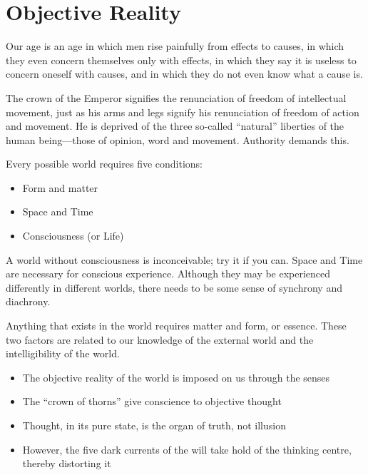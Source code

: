 \section{Objective Reality}

\begin{quotex}
Our age is an age in which men rise painfully from effects to causes, in which they even concern themselves only with effects, in which they say it is useless to concern oneself with causes, and in which they do not even know what a cause is.

The crown of the Emperor signifies the renunciation of freedom of intellectual movement, just as his arms and legs signify his renunciation of freedom of action and movement. He is deprived of the three so-called ``natural'' liberties of the human being---those of opinion, word and movement. Authority demands this.
\end{quotex}


Every possible world requires five conditions:

\begin{itemize}


\item Form and matter

\item Space and Time

\item Consciousness (or Life)
\end{itemize}


A world without consciousness is inconceivable; try it if you can. Space and Time are necessary for conscious experience. Although they may be experienced differently in different worlds, there needs to be some sense of synchrony and diachrony.

Anything that exists in the world requires matter and form, or essence. These two factors are related to our knowledge of the external world and the intelligibility of the world.

\begin{itemize}


\item The objective reality of the world is imposed on us through the senses

\item The ``crown of thorns'' give conscience to objective thought

\item Thought, in its pure state, is the organ of truth, not illusion

\item However, the five dark currents of the will take hold of the thinking centre, thereby distorting it
\end{itemize}


